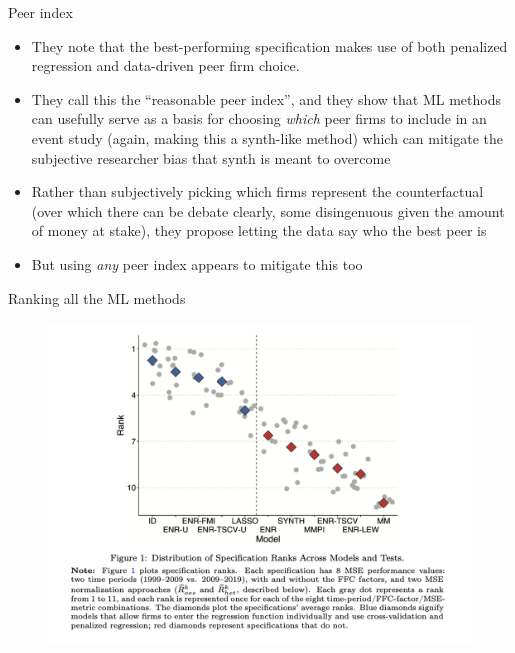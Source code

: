 \documentclass{beamer}
\begin{document}
\begin{frame}{Peer index}

\begin{itemize}
\item They note that the best-performing specification makes use of both penalized regression and data-driven peer firm choice.
\item They call this the ``reasonable peer index'', and they show that ML methods can usefully serve as a basis for choosing \emph{which} peer firms to include in an event study (again, making this a synth-like method) which can mitigate the subjective researcher bias that synth is meant to overcome
\item Rather than subjectively picking which firms represent the counterfactual (over which there can be debate clearly, some disingenuous given the amount of money at stake), they propose letting the data say who the best peer is
\item But using \emph{any} peer index appears to mitigate this too
\end{itemize}

\end{frame}

\begin{frame}{Ranking all the ML methods}

\begin{figure}
\includegraphics[scale=0.35]{./lecture_includes/baker_gelbach_5}
\end{figure}
\end{frame}
\end{document}
